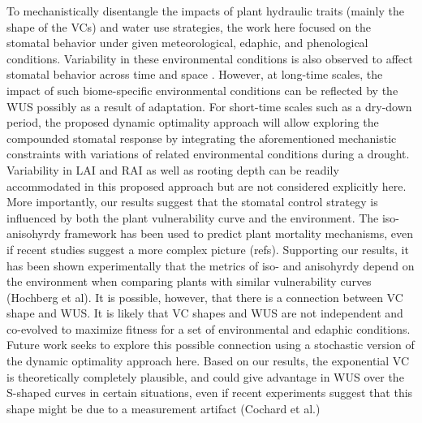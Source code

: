 \documentclass[utf8]{frontiersSCNS} %
\begin{document}
To mechanistically disentangle the impacts of plant hydraulic traits (mainly the shape of the VCs) and water use strategies, the work here focused on the stomatal behavior under given meteorological, edaphic, and phenological conditions. Variability in these environmental conditions is also observed to affect stomatal behavior across time and space \citep{feng2018beyond,novick2019beyond}. However, at long-time scales, the impact of such biome-specific environmental conditions can be reflected by the WUS possibly as a result of adaptation. For short-time scales such as a dry-down period, the proposed dynamic optimality approach will allow exploring the compounded stomatal response by integrating the aforementioned mechanistic constraints with variations of related environmental conditions during a drought. Variability in LAI and RAI as well as rooting depth can be readily accommodated in this proposed approach but are not considered explicitly here. More importantly, our results suggest that the stomatal control strategy is influenced by both the plant vulnerability curve and the environment. The iso-anisohyrdy framework has been used to predict plant mortality mechanisms, even if recent studies suggest a more complex picture (refs). Supporting our results, it has been shown experimentally that the metrics of iso- and anisohyrdy depend on the environment when comparing plants with similar vulnerability curves (Hochberg et al). It is possible, however, that there is a connection between VC shape and WUS.  It is likely that VC shapes and WUS are not independent and co-evolved to maximize fitness for a set of environmental and edaphic conditions. Future work seeks to explore this possible connection using a stochastic version of the dynamic optimality approach here. Based on our results, the exponential VC is theoretically completely plausible, and could give advantage in WUS over the S-shaped curves in certain situations, even if recent experiments suggest that this shape might be due to a measurement artifact (Cochard et al.) 




\end{document}
